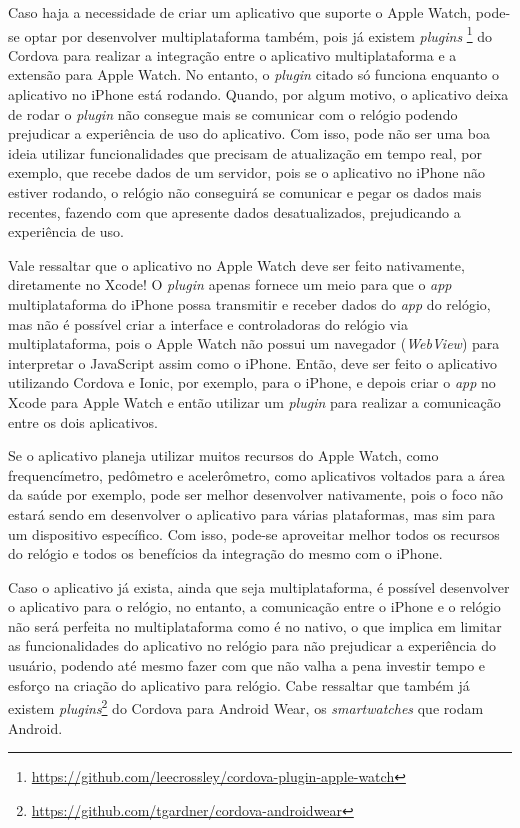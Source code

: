 Caso haja a necessidade de criar um aplicativo que suporte o Apple Watch, pode-se optar por desenvolver multiplataforma também, pois já existem \textit{plugins}
\footnote{\url{https://github.com/leecrossley/cordova-plugin-apple-watch}} do Cordova para realizar a integração entre o aplicativo multiplataforma e a extensão para Apple Watch. No entanto, o \textit{plugin} 
citado só funciona enquanto o aplicativo no iPhone está rodando. Quando, por algum motivo, o aplicativo deixa de rodar o \textit{plugin} não consegue mais se comunicar com o relógio podendo prejudicar a experiência 
de uso do aplicativo. Com isso, pode não ser uma boa ideia utilizar funcionalidades que precisam de atualização em tempo real, por exemplo, que recebe dados de um servidor, pois se o aplicativo no iPhone não 
estiver rodando, o relógio não conseguirá se comunicar e pegar os dados mais recentes, fazendo com 
que apresente dados desatualizados, prejudicando a experiência de uso.

Vale ressaltar que o aplicativo no Apple Watch deve ser feito nativamente, diretamente no Xcode! O \textit{plugin} apenas fornece um meio para que o \textit{app} multiplataforma do iPhone possa transmitir e receber 
dados do \textit{app} do relógio, mas não é possível criar a interface e controladoras do relógio via multiplataforma, pois o Apple Watch não possui um navegador (\textit{WebView}) para interpretar o JavaScript assim 
como o iPhone. Então, deve ser feito o aplicativo utilizando Cordova e Ionic, por exemplo, para o iPhone, e depois criar o \textit{app} no Xcode para Apple Watch e então utilizar um \textit{plugin} para realizar a 
comunicação entre os dois aplicativos.  

Se o aplicativo planeja utilizar muitos recursos do Apple Watch, como frequencímetro, pedômetro e acelerômetro, como aplicativos voltados para a área da saúde por exemplo, pode ser melhor desenvolver nativamente,
pois o foco não estará sendo em desenvolver o aplicativo para várias plataformas, mas sim para um dispositivo específico. Com isso, pode-se aproveitar melhor todos os recursos do relógio e todos os benefícios da integração
do mesmo com o iPhone.

Caso o aplicativo já exista, ainda que seja multiplataforma, é possível desenvolver o aplicativo para o relógio, no entanto, a comunicação entre o iPhone e o relógio não será perfeita no multiplataforma como é no nativo, 
o que implica em limitar as funcionalidades do aplicativo no relógio para não prejudicar a experiência do usuário, podendo até mesmo fazer com que não valha a pena investir tempo e esforço na criação do aplicativo para
relógio. Cabe ressaltar que também já existem \textit{plugins}\footnote{\url{https://github.com/tgardner/cordova-androidwear}} do Cordova para Android Wear, os \textit{smartwatches} que rodam Android. 

